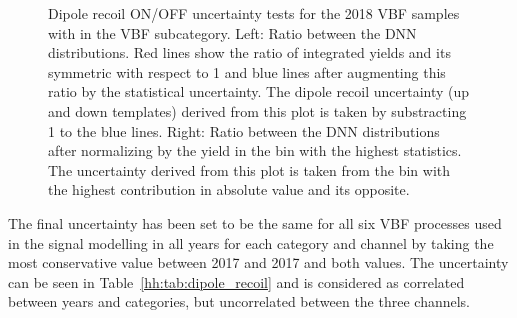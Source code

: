 \documentclass[../main.tex]{subfiles}
\begin{document}
\begin{figure}[h!]
\begin{center}
\end{center}
\caption{Dipole recoil ON/OFF uncertainty tests for the 2018 VBF samples with  in the VBF subcategory. Left: Ratio between the DNN distributions. Red lines show the ratio of integrated yields and its symmetric with respect to 1 and blue lines after augmenting this ratio by the statistical uncertainty. The dipole recoil uncertainty (up and down templates) derived from this plot is taken by substracting 1 to the blue lines. Right: Ratio between the DNN distributions after normalizing by the yield in the bin with the highest statistics. The uncertainty derived from this plot is taken from the bin with the highest contribution in absolute value and its opposite.}
\label{hh:fig:dipole_recoil}
\end{figure}


The final uncertainty has been set to be the same for all six VBF processes used in the signal modelling in all years for each category and channel by taking the most conservative value between 2017 and 2017 and both \kvv values. The uncertainty can be seen in Table~\ref{hh:tab:dipole_recoil} and is considered as correlated between years and categories, but uncorrelated between the three channels.
\end{document}
